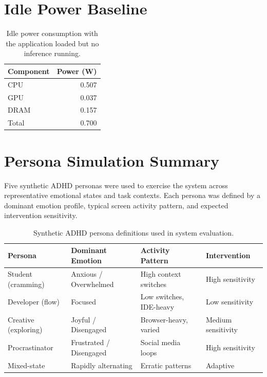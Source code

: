 \section{Idle Power Baseline}

\begin{table}[htbp]
  \centering
  \caption{Idle power consumption with the application loaded but no inference running.}
  \label{tab:idle-power}
  \begin{tabular}{@{}lr@{}}
    \toprule
    \textbf{Component} & \textbf{Power (W)} \\
    \midrule
    CPU  & 0.507 \\
    GPU  & 0.037 \\
    DRAM & 0.157 \\
    \midrule
    Total & 0.700 \\
    \bottomrule
  \end{tabular}
\end{table}

\section{Persona Simulation Summary}

Five synthetic ADHD personas were used to exercise the system across representative emotional states and task contexts. Each persona was defined by a dominant emotion profile, typical screen activity pattern, and expected intervention sensitivity.

\begin{table}[htbp]
  \centering
  \caption{Synthetic ADHD persona definitions used in system evaluation.}
  \label{tab:personas}
  \begin{tabular}{@{}llll@{}}
    \toprule
    \textbf{Persona} & \textbf{Dominant Emotion} & \textbf{Activity Pattern} & \textbf{Intervention} \\
    \midrule
    Student (cramming)  & Anxious / Overwhelmed & High context switches & High sensitivity \\
    Developer (flow)    & Focused               & Low switches, IDE-heavy & Low sensitivity \\
    Creative (exploring)& Joyful / Disengaged   & Browser-heavy, varied & Medium sensitivity \\
    Procrastinator      & Frustrated / Disengaged & Social media loops & High sensitivity \\
    Mixed-state         & Rapidly alternating    & Erratic patterns & Adaptive \\
    \bottomrule
  \end{tabular}
\end{table}

